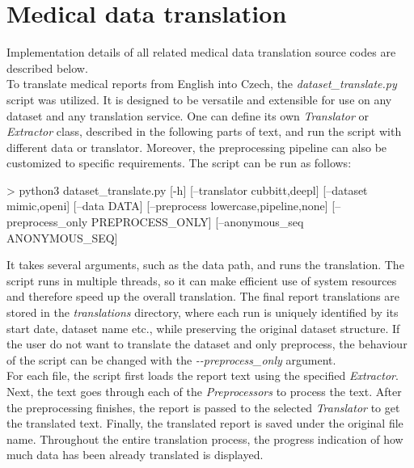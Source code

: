 \section{Medical data translation}
Implementation details of all related medical data translation source codes are described below.\\

To translate medical reports from English into Czech, the \textit{dataset\_translate.py} script was utilized. It is designed to be versatile and extensible for use on any dataset and any translation service. One can define its own \textit{Translator} or \textit{Extractor} class, described in the following parts of text, and run the script with different data or translator. Moreover, the preprocessing pipeline can also be customized to specific requirements. The script can be run as follows: \\
\begin{code}
> python3 dataset_translate.py [-h] [--translator {cubbitt,deepl}] 
                               [--dataset {mimic,openi}] 
                               [--data DATA]
                               [--preprocess {lowercase,pipeline,none}] 
                               [--preprocess_only PREPROCESS_ONLY]
                               [--anonymous_seq ANONYMOUS_SEQ]
\end{code}

It takes several arguments, such as the data path, and runs the translation. The script runs in multiple threads, so it can make efficient use of system resources and therefore speed up the overall translation. The final report translations are stored in the \textit{translations} directory, where each run is uniquely identified by its start date, dataset name etc., while preserving the original dataset structure. If the user do not want to translate the dataset and only preprocess, the behaviour of the script can be changed with the \textit{-{}-preprocess\_only} argument.\\

For each file, the script first loads the report text using the specified \textit{Extractor}. Next, the text goes through each of the \textit{Preprocessors} to process the text. After the preprocessing finishes, the report is passed to the selected \textit{Translator} to get the translated text. Finally, the translated report is saved under the original file name. Throughout the entire translation process, the progress indication of how much data has been already translated is displayed.\\

